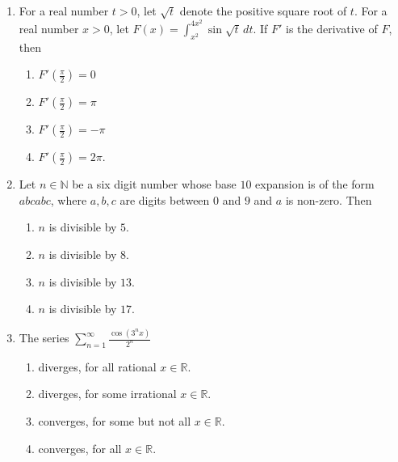 \documentclass[11pt, a4paper]{article}
\begin{document}
\begin{enumerate}
  \item For a real number $t > 0$, let $\sqrt{t}$ denote the positive square root of $t$. For a real number $x > 0$, let $F(x) = \int_{x^2}^{4x^2} \sin\sqrt{t}\,dt$. If $F'$ is the derivative of $F$, then
  \begin{enumerate}[label=\Alph*.]
    \item $F'\left(\frac{\pi}{2}\right) = 0$
    \item $F'\left(\frac{\pi}{2}\right) = \pi$
    \item $F'\left(\frac{\pi}{2}\right) = -\pi$
    \item $F'\left(\frac{\pi}{2}\right) = 2\pi$.
  \end{enumerate}

  \item Let $n \in \mathbb{N}$ be a six digit number whose base $10$ expansion is of the form $abcabc$, where $a, b, c$ are digits between $0$ and $9$ and $a$ is non-zero. Then
  \begin{enumerate}[label=\Alph*.]
    \item $n$ is divisible by $5$.
    \item $n$ is divisible by $8$.
    \item $n$ is divisible by $13$.
    \item $n$ is divisible by $17$.
  \end{enumerate}

  \item The series $\displaystyle \sum_{n=1}^\infty \frac{\cos(3^n x)}{2^n}$
  \begin{enumerate}[label=\Alph*.]
    \item diverges, for all rational $x \in \mathbb{R}$.
    \item diverges, for some irrational $x \in \mathbb{R}$.
    \item converges, for some but not all $x \in \mathbb{R}$.
    \item converges, for all $x \in \mathbb{R}$.
  \end{enumerate}
\end{enumerate}
\end{document}
